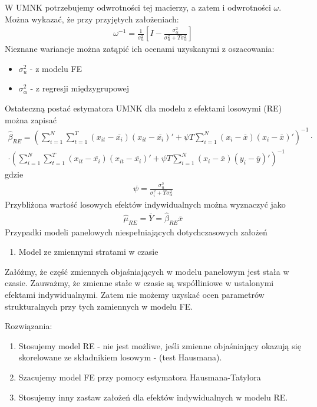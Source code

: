 W UMNK potrzebujemy odwrotności tej macierzy, a zatem i odwrotności $ \omega $. Można wykazać, że przy przyjętych założeniach:
\begin{gather*}
\omega^{-1}=\frac{1}{\sigma_u^2}\left[I-\frac{\sigma_\alpha^2}{\sigma_u^2+T\sigma_\alpha^2}\right]
\end{gather*}
Nieznane wariancje można zatąpić ich ocenami uzyskanymi z oszacowania:
\begin{itemize}
\item $ \sigma_u^2 $ - z modelu FE
\item $ \sigma_\alpha^2 $ - z regresji międzygrupowej
\end{itemize}
Ostateczną postać estymatora UMNK dla modelu z efektami losowymi (RE) można zapisać
\begin{gather*}
\hat \beta_{RE}=
\left(
\sum_{i=1}^{N}\sum_{t=1}^{T}
\left(x_{it}-\overline{x_i}\right)
\left(x_{it}-\overline{x_i}\right)'+
\psi T\sum_{i=1}^{N}
\left(x_i-\overline{x}\right)
\left(x_i-\overline{x}\right)'
\right)^{-1}
\cdot\\\cdot
\left(
\sum_{i=1}^{N}\sum_{t=1}^{T}
\left(x_{it}-\overline{x_i}\right)
\left(x_{it}-\overline{x_i}\right)'+
\psi T\sum_{i=1}^{N}
\left(x_i-\overline{x}\right)
\left(y_i-\overline{y}\right)'
\right)^{-1}
\end{gather*}
gdzie
\begin{gather*}
\psi=\frac{\sigma_u^2}{\sigma_i^2+T\sigma_\alpha^2}
\end{gather*}
Przybliżona wartość losowych efektów indywidualnych można wyznaczyć jako
\begin{gather*}
\hat \mu_{RE}=\overline Y=\hat \beta_{RE}\overline x
\end{gather*}
Przypadki modeli panelowych niespełniających dotychczasowych założeń
\begin{enumerate}
\item Model ze zmiennymi stratami w czasie
\end{enumerate}
Załóżmy, że część zmiennych objaśniających w modelu panelowym jest stała w czasie. Zauważmy, że zmienne stałe w czasie są współliniowe w ustalonymi efektami indywidualnymi. Zatem nie możemy uzyskać ocen parametrów strukturalnych przy tych zamiennych w modelu FE.

Rozwiązania:
\begin{enumerate}
\item Stosujemy model RE - nie jest możliwe, jeśli zmienne objaśniający okazują się skorelowane ze składnikiem losowym - (test Hausmana).
\item Szacujemy model FE przy pomocy estymatora Hausmana-Tatylora
\item Stosujemy inny zastaw założeń dla efektów indywidualnych w modelu RE.
\end{enumerate}